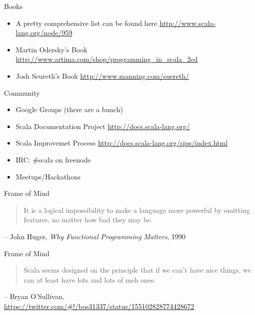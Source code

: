 \documentclass[14pt,t,usepdftitle=false,xcolornames=x11names,svgnames,dvipsnames,usenames]{beamer}
\newcommand{\tinyurl}[1]{
  {\tiny{\textcolor{keyword}{\url{#1}}}}}
\begin{document}
\begin{frame}{Books}
  \begin{itemize}[<+->]
    \item A pretty comprehensive list can be found here \tinyurl{http://www.scala-lang.org/node/959}
    \item Martin Odersky's Book \tinyurl{http://www.artima.com/shop/programming_in_scala_2ed}
    \item Josh Seureth's Book \tinyurl{http://www.manning.com/suereth/}
  \end{itemize}
\end{frame}

\begin{frame}{Community}
  \begin{itemize}[<+->]
    \item Google Groups (there are a bunch)
    \item Scala Documentation Project \tinyurl{http://docs.scala-lang.org/}
    \item Scala Improvemet Process \tinyurl{http://docs.scala-lang.org/sips/index.html}
    \item IRC: \#scala on freenode
    \item Meetups/Hackathons
  \end{itemize}
\end{frame}

\begin{frame}{Frame of Mind}
  \begin{quote}
    It is a logical impossibility to make a language more powerful
    by omitting features, no matter how bad they may be.
  \end{quote}
  \begin{flushright}
    \tiny{\textcolor{keyword}{-- John Huges, \emph{Why Functional Programming Matters}, 1990}}
  \end{flushright}
\end{frame}

\begin{frame}{Frame of Mind}
  \begin{quote}
    Scala seems designed on the principle that if we can't have nice
    things, we can at least have lots and lots of meh ones.
  \end{quote}
  \begin{flushright}
    \tiny{\textcolor{keyword}{-- Bryan O'Sullivan, \url{https://twitter.com/\#!/bos31337/status/155102828774428672}}}
  \end{flushright}
\end{frame}
\end{document}
